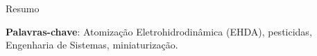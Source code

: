 \setlength{\absparsep}{18pt} %
\begin{resumo}

Resumo

 \textbf{Palavras-chave}: Atomização Eletrohidrodinâmica (EHDA), pesticidas, Engenharia de Sistemas, miniaturização.
\end{resumo}